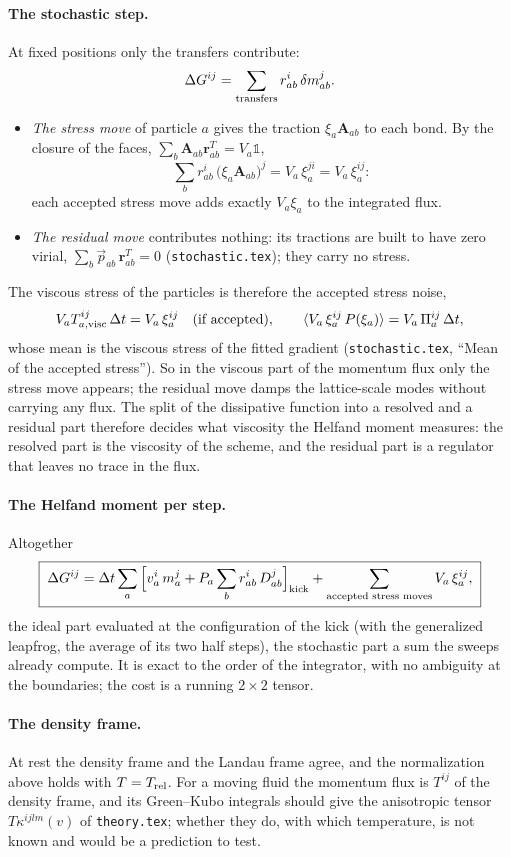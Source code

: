 \documentclass[11pt,aps,preprint,nofootinbib,superscriptaddress,tightenlines]{revtex4-2}
\def\st{\begin{equation}}
\def\stp{\end{equation}}
\newcommand{\one}{\mathds{1}}
\newcommand{\avg}[1]{\langle #1\rangle}
\let\oldparagraph\paragraph
\renewcommand{\paragraph}{\par\bigskip\oldparagraph}
\begin{document}
\paragraph{The stochastic step.}  At fixed positions only the transfers contribute:
\st
\Delta G^{ij}=\sum_{\rm transfers}r_{ab}^i\,\delta m_{ab}^j .
\stp
\begin{itemize}
\item \emph{The stress move} of particle $a$ gives the traction $\xi_a\bm A_{ab}$ to each bond.  By the closure of the faces,
  $\sum_b\bm A_{ab}\bm r_{ab}^T=V_a\one$,
  \st
  \sum_br_{ab}^i\,\big(\xi_a\bm A_{ab}\big)^j=V_a\,\xi_a^{ji}=V_a\,\xi_a^{ij} :
  \stp
  each accepted stress move adds exactly $V_a\xi_a$ to the integrated flux.
\item \emph{The residual move} contributes nothing: its tractions are built to have zero virial,
  $\sum_b\vec p_{ab}\,\bm r_{ab}^T=0$ (\texttt{stochastic.tex}); they carry no stress.
\end{itemize}
The viscous stress of the particles is therefore the accepted stress noise,
\st
V_aT^{ij}_{a,\rm visc}\,\Delta t=V_a\,\xi_a^{ij}\quad\text{(if accepted)},\qquad
\avg{V_a\,\xi_a^{ij}\,P(\xi_a)}=V_a\,\Pi_a^{ij}\,\Delta t ,
\stp
whose mean is the viscous stress of the fitted gradient (\texttt{stochastic.tex}, ``Mean of the accepted stress'').  So in the viscous part of the momentum flux only the stress move appears; the
residual move damps the lattice-scale modes without carrying any flux.  The split of the dissipative function into a resolved and a
residual part therefore decides what viscosity the Helfand moment measures: the resolved part is the viscosity of the scheme, and the
residual part is a regulator that leaves no trace in the flux.

\paragraph{The Helfand moment per step.}  Altogether
\st
\boxed{\;\Delta G^{ij}=\Delta t\sum_a\Big[v_a^i\,m_a^j+P_a\sum_br_{ab}^i\,D_{ab}^j\Big]_{\rm kick}
+\sum_{\text{accepted stress moves}}V_a\,\xi_a^{ij} ,\;}
\label{accumulate}
\stp
the ideal part evaluated at the configuration of the kick (with the generalized leapfrog, the average of its two half steps),
the stochastic part a sum the sweeps already compute.  It is exact to the order of the integrator, with no ambiguity at the
boundaries; the cost is a running $2\times2$ tensor.

\paragraph{The density frame.}  At rest the density frame and the Landau frame agree, and the normalization above holds with
$T=T_{\rm rel}$.  For a moving fluid the momentum flux is $T^{ij}$ of the density frame, and its Green--Kubo integrals should give the
anisotropic tensor $T\kappa^{ijlm}(v)$ of \texttt{theory.tex}; whether they do, with which temperature, is not known and would be
a prediction to test.
\end{document}
